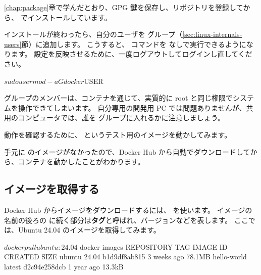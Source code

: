 \ref{chap:package}章で学んだとおり、GPG 鍵を保存し、リポジトリを登録してから、 でインストールしています。

インストールが終わったら、自分のユーザを  グループ（\ref{sec:linux-internals-users}節）に追加します。
こうすると、 コマンドを  なしで実行できるようになります。
設定を反映させるために、一度ログアウトしてログインし直してください。

\begin{terminal}
$ sudo usermod -aG docker $USER
\end{terminal}

\begin{caution}
   グループのメンバーは、コンテナを通じて、実質的に root と同じ権限でシステムを操作できてしまいます。
  自分専用の開発用 PC では問題ありませんが、共用のコンピュータでは、誰を  グループに入れるかに注意しましょう。
\end{caution}

動作を確認するために、 というテスト用のイメージを動かしてみます。


手元に  のイメージがなかったので、Docker Hub から自動でダウンロードしてから、コンテナを動かしたことがわかります。

\subsection{イメージを取得する}

Docker Hub からイメージをダウンロードするには、 を使います。
イメージの名前の後ろの \cmd{:} に続く部分は\textbf{タグ}と呼ばれ、バージョンなどを表します。
ここでは、Ubuntu 24.04 のイメージを取得してみます。

\begin{terminal}[イメージを取得して一覧を見る]
$ docker pull ubuntu:24.04
$ docker images
REPOSITORY    TAG       IMAGE ID       CREATED       SIZE
ubuntu        24.04     b1d9df8ab815   3 weeks ago   78.1MB
hello-world   latest    d2c94e258dcb   1 year ago    13.3kB
\end{terminal}

